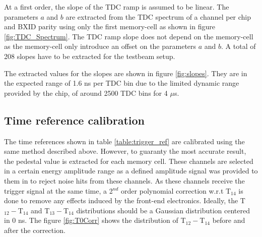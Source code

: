 \documentclass{JINST}
\begin{document}
At a first order, the slope of the TDC ramp is assumed to be linear. The parameters $a$ and $b$ are extracted from the TDC spectrum of a channel per chip and BXID parity using only the first memory-cell as shown in figure \ref{fig:TDC_Spectrum}. The TDC ramp slope does not depend on the memory-cell as the memory-cell only introduce an offset on the parameters $a$ and $b$. A total of 208 slopes have to be extracted for the testbeam setup.

The extracted values for the slopes are shown in figure \ref{fig:slopes}. They are in the expected range of 1.6 ns per TDC bin due to the limited dynamic range provided by the chip, of around 2500 TDC bins for 4 $\mu$s.

\subsection{Time reference calibration}

The time references shown in table \ref{table:trigger_ref} are calibrated using the same method described above. However, to guaranty the most accurate result, the pedestal value is extracted for each memory cell. These channels are selected in a certain energy amplitude range as a defined amplitude signal was provided to them in to reject noise hits from these channels. As these channels receive the trigger signal at the same time, a 2$^{nd}$ order polynomial correction w.r.t T$_{14}$ is done to remove any effects induced by the front-end electronics. Ideally, the T$_{12} - $T$_{14}$ and T$_{13} - $T$_{14}$ distributions should be a Gaussian distribution centered in 0 ns. The figure \ref{fig:T0Corr} shows the distribution of T$_{12} - $T$_{14}$ before and after the correction.
\end{document}
